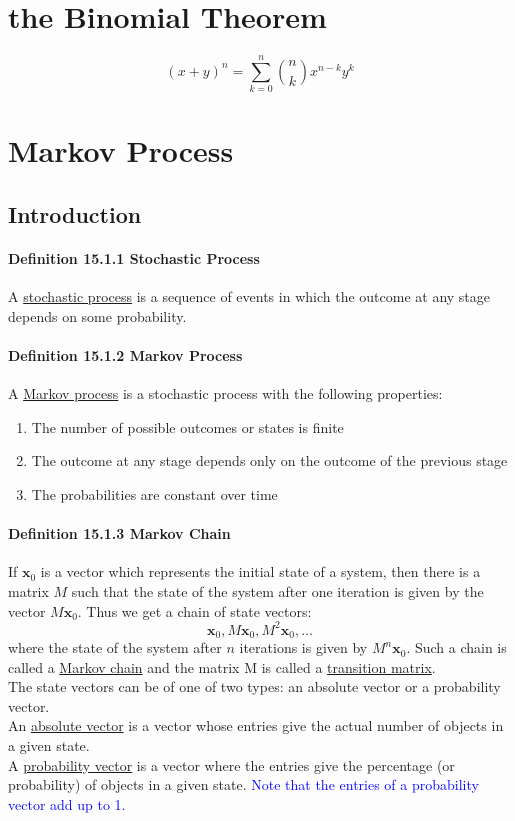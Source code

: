 \documentclass[11pt]{article}
\newcommand{\tb}[1]{\textbf{#1}}
\newcommand{\under}[1]{\underline{#1}}
\newcommand{\vx}[0]{\tb{x}}
\begin{document}
\section{the Binomial Theorem}
$$(x+y)^n = \sum_{k=0}^n \binom{n}{k} x^{n-k}y^k$$

\section{Markov Process}
\subsection{Introduction}
\paragraph{Definition 15.1.1 Stochastic Process}
A \under{stochastic process} is a sequence of events in which the outcome at any stage depends on some probability.

\paragraph{Definition 15.1.2 Markov Process}
A \under{Markov process} is a stochastic process with the following properties:
\begin{enumerate}
	\item The number of possible outcomes or states is finite
	\item The outcome at any stage depends only on the outcome of the previous stage
	\item The probabilities are constant over time
\end{enumerate}
 
\paragraph{Definition 15.1.3 Markov Chain}
If $\vx_0$ is a vector which represents the initial state of a system, then there is a matrix $M$ such that the state of the system after one iteration is given by the vector $M\vx_0$. Thus we get a chain of state vectors:
$$\vx_0, M\vx_0, M^2\vx_0, \hdots$$
where the state of the system after $n$ iterations is given by $M^n\vx_0$. Such a chain is called a \under{Markov chain} and the matrix M is called a \under{transition matrix}. \\
The state vectors can be of one of two types: an absolute vector or a probability vector.\\ 
An \under{absolute vector} is a vector whose entries give the actual number of objects in a given state. \\
A \under{probability vector} is a vector where the entries give the percentage (or probability) of objects in a given state. \textcolor{blue}{Note that the entries of a probability vector add up to 1.}
\end{document}
